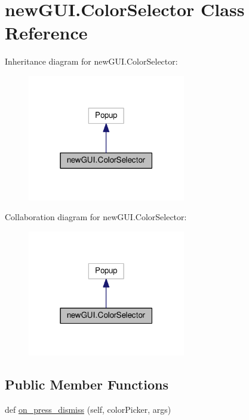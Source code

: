\hypertarget{classnewGUI_1_1ColorSelector}{}\section{new\+G\+U\+I.\+Color\+Selector Class Reference}
\label{classnewGUI_1_1ColorSelector}


Inheritance diagram for new\+G\+U\+I.\+Color\+Selector\+:
\nopagebreak
\begin{figure}[H]
\begin{center}
\leavevmode
\includegraphics[width=195pt]{classnewGUI_1_1ColorSelector__inherit__graph}
\end{center}
\end{figure}


Collaboration diagram for new\+G\+U\+I.\+Color\+Selector\+:
\nopagebreak
\begin{figure}[H]
\begin{center}
\leavevmode
\includegraphics[width=195pt]{classnewGUI_1_1ColorSelector__coll__graph}
\end{center}
\end{figure}
\subsection*{Public Member Functions}
\begin{DoxyCompactItemize}
\item 
def \hyperlink{classnewGUI_1_1ColorSelector_a273d922b2792916abc4be0761209bc94}{on\+\_\+press\+\_\+dismiss} (self, color\+Picker, args)
\end{DoxyCompactItemize}
